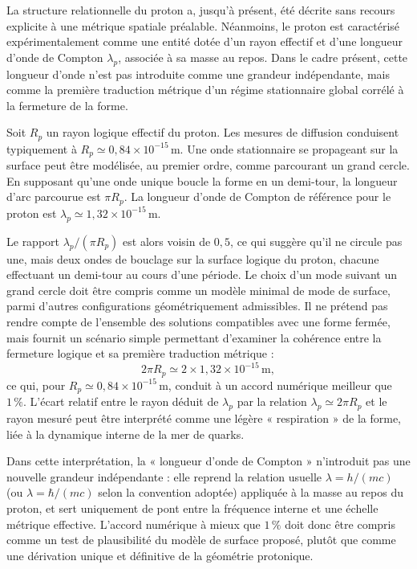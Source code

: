 \documentclass[11pt,a4paper]{article}
\begin{document}
La structure relationnelle du proton a, jusqu’à présent, été décrite sans recours explicite à une métrique spatiale préalable. Néanmoins, le proton est caractérisé expérimentalement comme une entité dotée d’un rayon effectif et d’une longueur d’onde de Compton \(\lambda_p\), associée à sa masse au repos. Dans le cadre présent, cette longueur d’onde n’est pas introduite comme une grandeur indépendante, mais comme la première traduction métrique d’un régime stationnaire global corrélé à la fermeture de la forme.

Soit \(R_p\) un rayon logique effectif du proton. Les mesures de diffusion conduisent typiquement à \(R_p \simeq 0{,}84\times 10^{-15}\,\mathrm{m}\). Une onde stationnaire se propageant sur la surface peut être modélisée, au premier ordre, comme parcourant un grand cercle. En supposant qu’une onde unique boucle la forme en un demi-tour, la longueur d’arc parcourue est \(\pi R_p\). La longueur d’onde de Compton de référence pour le proton est \(\lambda_p \simeq 1{,}32\times 10^{-15}\,\mathrm{m}\).

Le rapport \(\lambda_p/(\pi R_p)\) est alors voisin de \(0{,}5\), ce qui suggère qu’il ne circule pas une, mais deux ondes de bouclage sur la surface logique du proton, chacune effectuant un demi-tour au cours d’une période. Le choix d’un mode suivant un grand cercle doit être compris comme un modèle minimal de mode de surface, parmi d’autres configurations géométriquement admissibles. Il ne prétend pas rendre compte de l’ensemble des solutions compatibles avec une forme fermée, mais fournit un scénario simple permettant d’examiner la cohérence entre la fermeture logique et sa première traduction métrique :
\[
2\pi R_p \simeq 2\times 1{,}32\times 10^{-15}\,\mathrm{m},
\]
ce qui, pour \(R_p \simeq 0{,}84\times 10^{-15}\,\mathrm{m}\), conduit à un accord numérique meilleur que \(1\,\%\). L’écart relatif entre le rayon déduit de \(\lambda_p\) par la relation \(\lambda_p \simeq 2\pi R_p\) et le rayon mesuré peut être interprété comme une légère « respiration » de la forme, liée à la dynamique interne de la mer de quarks.

Dans cette interprétation, la « longueur d’onde de Compton » n’introduit pas une nouvelle grandeur indépendante : elle reprend la relation usuelle \(\lambda = h/(mc)\) (ou \(\lambda = \hbar/(mc)\) selon la convention adoptée) appliquée à la masse au repos du proton, et sert uniquement de pont entre la fréquence interne et une échelle métrique effective. L’accord numérique à mieux que \(1\,\%\) doit donc être compris comme un test de plausibilité du modèle de surface proposé, plutôt que comme une dérivation unique et définitive de la géométrie protonique.
\end{document}
